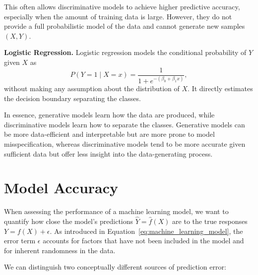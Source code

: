 This often allows discriminative models to achieve higher predictive accuracy, especially when the amount of training data is large. 
However, they do not provide a full probabilistic model of the data and cannot generate new samples $(X,Y)$.

\begin{example}
\textbf{Logistic Regression.}  
Logistic regression models the conditional probability of $Y$ given $X$ as
\[
P(Y=1\mid X=x)=\frac{1}{1+e^{-(\beta_0+\beta_1x)}},
\]
without making any assumption about the distribution of $X$. 
It directly estimates the decision boundary separating the classes.
\end{example}

In essence, generative models learn how the data are produced, while discriminative models learn how to separate the classes. Generative models can be more data-efficient and interpretable but are more prone to model misspecification, whereas discriminative models tend to be more accurate given sufficient data but offer less insight into the data-generating process.


% 
% 
% 


\section{Model Accuracy}
\label{sec:model_accuracy}

When assessing the performance of a machine learning model, we want to quantify how close the model’s predictions $\hat{Y}=\hat{f}(X)$ are to the true responses $Y=f(X)+\epsilon$. As introduced in Equation~\ref{eq:machine_learning_model}, the error term $\epsilon$ accounts for factors that have not been included in the model and for inherent randomness in the data. 

We can distinguish two conceptually different sources of prediction error:

